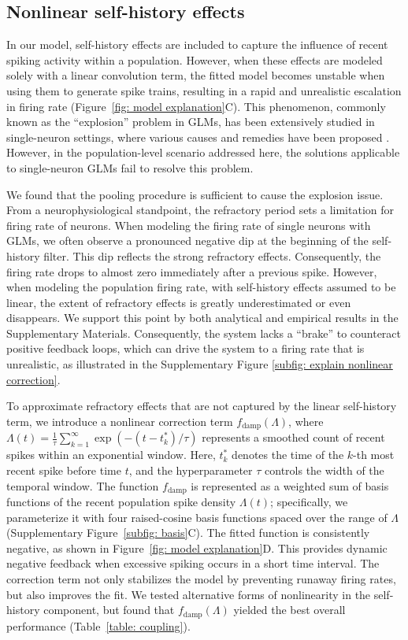 \documentclass[12pt]{article}
\begin{document}
\subsection{Nonlinear self-history effects}
\label{sec:Nonlinear self-history effects}

In our model, self-history effects are included to capture the influence of recent spiking activity within a population. However, when these effects are modeled solely with a linear convolution term, the fitted model becomes unstable when using them to generate spike trains, resulting in a rapid and unrealistic escalation in firing rate (Figure~\ref{fig: model explanation}C). This phenomenon, commonly known as the ``explosion'' problem in GLMs, has been extensively studied in single-neuron settings, where various causes and remedies have been proposed \citep{chen2019stability}. However, in the population-level scenario addressed here, the solutions applicable to single-neuron GLMs fail to resolve this problem.

We found that the pooling procedure is sufficient to cause the explosion issue. From a neurophysiological standpoint, the refractory period sets a limitation for firing rate of neurons. When modeling the firing rate of single neurons with GLMs, we often observe a pronounced negative dip at the beginning of the self-history filter. This dip reflects the strong refractory effects. Consequently, the firing rate drops to almost zero immediately after a previous spike. However, when modeling the population firing rate, with self-history effects assumed to be linear, the extent of refractory effects is greatly underestimated or even disappears. We support this point by both analytical and empirical results in the Supplementary Materials. Consequently, the system lacks a ``brake'' to counteract positive feedback loops, which can drive the system to a firing rate that is unrealistic, as illustrated in the Supplementary Figure \ref{subfig: explain nonlinear correction}.

To approximate refractory effects that are not captured by the linear self-history term, we introduce a nonlinear correction term $f_{\text{damp}}(\Lambda)$, where $\Lambda(t) = \frac{1}{\tau} \sum_{k=1}^\infty \exp(-(t - t_k^*) / \tau)$ represents a smoothed count of recent spikes within an exponential window. Here, $t_k^*$ denotes the time of the $k$-th most recent spike before time $t$, and the hyperparameter $\tau$ controls the width of the temporal window. The function $f_{\text{damp}}$ is represented as a weighted sum of basis functions of the recent population spike density $\Lambda(t)$; specifically, we parameterize it with four raised-cosine basis functions spaced over the range of $\Lambda$ (Supplementary Figure~\ref{subfig: basis}C). The fitted function is consistently negative, as shown in Figure~\ref{fig: model explanation}D. This provides dynamic negative feedback when excessive spiking occurs in a short time interval. The correction term not only stabilizes the model by preventing runaway firing rates, but also improves the fit. We tested alternative forms of nonlinearity in the self-history component, but found that $f_{\text{damp}}(\Lambda)$ yielded the best overall performance (Table~\ref{table: coupling}).
\end{document}

